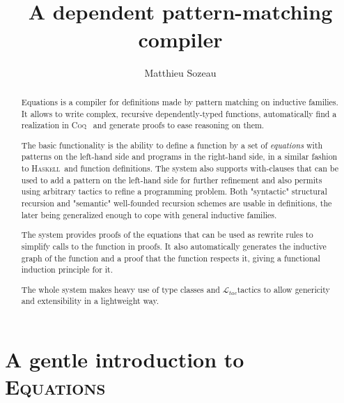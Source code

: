 \documentclass{article}
\author{Matthieu Sozeau}
\title{\Equations\\
  A dependent pattern-matching compiler}
\def\name#1{\textsc{#1}~}
\def\Coq{\name{Coq}}
\def\Haskell{\name{Haskell}}
\def\text#1{#1}
\def\Ltac{$\mathcal{\text{L}}_{\text{tac}}$}
\def\Equations{\name{Equations}}
\begin{document}
\maketitle

\begin{abstract}
  Equations is a compiler for definitions made by pattern matching on
  inductive families. It allows to write complex, recursive
  dependently-typed functions, automatically find a realization in \Coq 
  and generate proofs to ease reasoning on them.

  The basic functionality is the ability to define a function by a set
  of \textit{equations} with patterns on the left-hand side and programs
  in the right-hand side, in a similar fashion to \Haskell and \Agda
  function definitions. The system also supports with-clauses that can
  be used to add a pattern on the left-hand side for further refinement
  and also permits using arbitrary tactics to refine a programming
  problem. Both "syntactic" structural recursion and "semantic" well-founded 
  recursion schemes are usable in definitions, the later being
  generalized enough to cope with general inductive families.
  
  The system provides proofs of the equations that can be used as
  rewrite rules to simplify calls to the function in proofs. It also
  automatically generates the inductive graph of the function and a
  proof that the function respects it, giving a functional induction
  principle for it. 
  
  The whole system makes heavy use of type classes and \Ltac tactics to
  allow genericity and extensibility in a lightweight way.
\end{abstract}

\section{A gentle introduction to \Equations}



  


\end{document}
